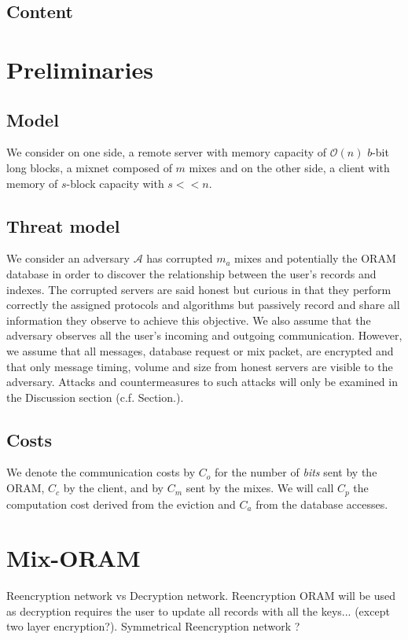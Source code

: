 \documentclass[a4paper]{article}
\begin{document}
\subsection{Content}

\section{Preliminaries}
\subsection{Model}
We consider on one side, a remote server with memory capacity of $\mathcal{O}\left(n\right)$ $b$-bit long blocks, a mixnet composed of $m$ mixes and on the other side, a client with memory of $s$-block capacity with $s<<n$. 

\subsection{Threat model}
We consider an adversary $\mathcal{A}$ has corrupted $m_{a}$ mixes and potentially the ORAM database in order to discover the relationship between the user's records and indexes. 
The corrupted servers are said honest but curious in that they perform correctly the assigned protocols and algorithms but passively record and share all information they observe to achieve this objective.
We also assume that the adversary observes all the user's incoming and outgoing communication. However, we assume that all messages, database request or mix packet, are encrypted and that only message timing, volume and size from honest servers are visible to the adversary.
Attacks and countermeasures to such attacks will only be examined in the Discussion section (c.f. Section.\cite{}).

\subsection{Costs}
We denote the communication costs by $C_o$ for the number of \emph{bits} sent by the ORAM, $C_{c}$ by the client, and by $C_{m}$ sent by the mixes. 
We will call $C_p$ the computation cost derived from the eviction and $C_a$ from the database accesses.


\section{Mix-ORAM}

Reencryption network vs Decryption network. Reencryption ORAM will be used as decryption requires the user to update all records with all the keys... (except two layer encryption?).
Symmetrical Reencryption network ?
\end{document}
